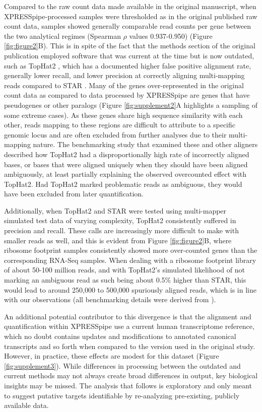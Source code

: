\documentclass[10pt, oneside]{article}
\begin{document}
Compared to the raw count data made available in the original manuscript, when XPRESSpipe-processed samples were thresholded as in the original published raw count data, samples showed generally comparable read counts per gene between the two analytical regimes (Spearman $\rho$ values 0.937-0.950) (Figure \ref{fig:figure2}B). This is in spite of the fact that the methods section of the original publication employed software that was current at the time but is now outdated, such as TopHat2 \cite{tophat2}, which has a documented higher false positive alignment rate, generally lower recall, and lower precision at correctly aligning multi-mapping reads compared to STAR \cite{alignment_benchmark, star}. Many of the genes over-represented in the original count data as compared to data processed by XPRESSpipe are genes that have pseudogenes or other paralogs (Figure \ref{fig:supplement2}A highlights a sampling of some extreme cases). As these genes share high sequence similarity with each other, reads mapping to these regions are difficult to attribute to a specific genomic locus and are often excluded from further analyses due to their multi-mapping nature. The benchmarking study \cite{alignment_benchmark} that examined these and other aligners described how TopHat2 had a disproportionally high rate of incorrectly aligned bases, or bases that were aligned uniquely when they should have been aligned ambiguously, at least partially explaining the observed overcounted effect with TopHat2. Had TopHat2 marked problematic reads as ambiguous, they would have been excluded from later quantification. \par

Additionally, when TopHat2 and STAR were tested using multi-mapper simulated test data of varying complexity, TopHat2 consistently suffered in precision and recall. These calls are increasingly more difficult to make with smaller reads as well, and this is evident from Figure \ref{fig:figure2}B, where ribosome footprint samples consistently showed more over-counted genes than the corresponding RNA-Seq samples. When dealing with a ribosome footprint library of about 50-100 million reads, and with TopHat2's simulated likelihood of not marking an ambiguous read as such being about 0.5\% higher than STAR, this would lead to around 250,000 to 500,000 spuriously aligned reads, which is in line with our observations (all benchmarking details were derived from \cite{alignment_benchmark}). \par

An additional potential contributor to this divergence is that the alignment and quantification within XPRESSpipe use a current human transcriptome reference, which no doubt contains updates and modifications to annotated canonical transcripts and so forth when compared to the version used in the original study. However, in practice, these effects are modest for this dataset (Figure \ref{fig:supplement3}). While differences in processing between the outdated and current methods may not always create broad differences in output, key biological insights may be missed. The analysis that follows is exploratory and only meant to suggest putative targets identifiable by re-analyzing pre-existing, publicly available data. \par
\end{document}
